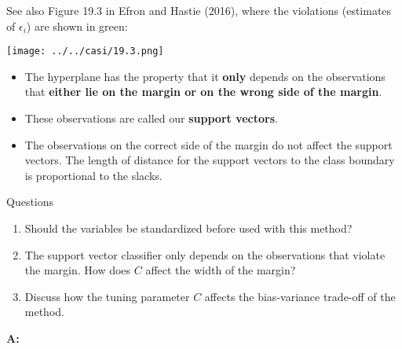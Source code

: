 \documentclass[10pt,ignorenonframetext,]{beamer}
\begin{document}
\begin{frame}

See also Figure 19.3 in Efron and Hastie (2016), where the violations
(estimates of \(\epsilon_i\)) are shown in green:

\centering
\texttt{[image: ../../casi/19.3.png]}

\end{frame}

\begin{frame}

\begin{itemize}
\item
  The hyperplane has the property that it \textbf{only} depends on the
  observations that \textbf{either lie on the margin or on the wrong
  side of the margin}.
\item
  These observations are called our \textbf{support vectors}.
\item
  The observations on the correct side of the margin do not affect the
  support vectors. The length of distance for the support vectors to the
  class boundary is proportional to the slacks.
\end{itemize}

\end{frame}

\begin{frame}

\begin{block}{Questions}

\begin{enumerate}
\def\labelenumi{\arabic{enumi}.}
\item
  Should the variables be standardized before used with this method?
\item
  The support vector classifier only depends on the observations that
  violate the margin. How does \(C\) affect the width of the margin?
\item
  Discuss how the tuning parameter \(C\) affects the bias-variance
  trade-off of the method.
\end{enumerate}

\end{block}

\end{frame}

\begin{frame}

\textbf{A:}

\end{frame}
\end{document}

